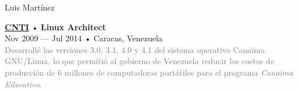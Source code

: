 \documentclass[12pt]{article}
\begin{document}
\begin{cv}{Luis Mart\'inez}
\begin{minipage}[t]{0.55\textwidth}
{    }\vspace{0.125em}
    \parbox[t]{\linewidth}{
      \textbf{\href{https://www.cnti.gob.ve}{CNTI}} • \textrm{\textbf{Linux Architect}}\\
      Nov 2009 --- Jul 2014 • Caracas, Venezuela\\
      \footnotesize{\textcolor{gray}{Desarrollé las versiones 3.0, 3.1, 4.0 y 4.1 del sistema operativo Canaima GNU/Linux, lo que permitió al gobierno de Venezuela reducir los costos de producción de 6 millones de computadoras portátiles para el programa \textsl{Canaima Educativo}.}}\\
    }
  \end{minipage}

\end{cv}
\end{document}

